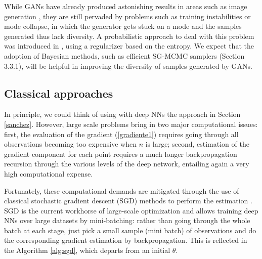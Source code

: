 While GANs have already produced astonishing results in areas such as image generation \cite{Karras2019stylegan2,brock2018large}, they are still pervaded by problems such as training instabilities or mode collapse, in which the generator gets stuck on a mode and the samples generated thus lack diversity. A probabilistic approach to deal with this problem was introduced in \cite{dieng2019prescribed}, using a regularizer based on the entropy. We expect that the adoption of Bayesian methods,
 such as efficient SG-MCMC samplers (Section 3.3.1), will be helpful
in improving the diversity of samples generated by GANs.

\subsection{Classical approaches}

In principle, we could think of using 
with deep NNs the approach in Section \ref{sanchez}. However,
 large scale problems bring in two major
computational issues: first, the 
evaluation of the gradient (\ref{gradiente1}) 
requires going through all observations
 becoming too expensive when $n$ is large;
second, estimation of the gradient component
for each point requires a much longer backpropagation recursion through the various levels of the
deep network, 
entailing again a very high computational 
expense. 

Fortunately, these computational demands are mitigated
through the use of classical stochastic gradient descent
(SGD)
methods \cite{robbins}
to perform the estimation \cite{bottou2010large}. SGD is the current workhorse of large-scale optimization and 
allows training deep NNs over large datasets by mini-batching: rather than going through the whole batch at each stage, just pick a small sample
(mini batch) of observations and do the corresponding
gradient estimation by backpropagation. This is reflected in the Algorithm \ref{alg:sgd}, which departs from an
initial $\theta$.

